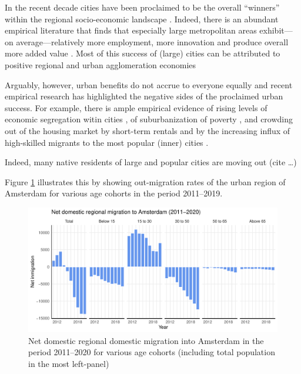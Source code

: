 \documentclass[11pt,parskip,abstracton,notitlepage, dvipsnames]{scrartcl}
\begin{document}
In the recent decade cities have been proclaimed to be the overall ``winners''
within the regional socio-economic landscape \citep[]{glaeser2012triumph}.
Indeed, there is an abundant empirical literature that finds that especially
large metropolitan areas exhibit---on average---relatively more employment, more
innovation and produce overall more added value \citep[see,
e.g.,][]{balland2020complex}. Most of this success of (large) cities can be
attributed to positive regional and urban agglomeration economies \citep[see for
recent overviews of the size, scope and nature of these urban
economies][]{melo2009meta, duranton2020, rosenthal2020}

Arguably, however, urban benefits do not accrue to everyone equally and recent
empirical research has highlighted the negative sides of the proclaimed urban
success. For example, there is ample empirical evidence of rising levels of
economic segregation witin cities \citep{tammaru2015socio}, of suburbanization
of poverty \citep{hochstenbach2018gentrification}, and crowding out of the
housing market by short-term rentals \citep{koster2018short} and by the
increasing influx of high-skilled migrants to the most popular (inner) cities
\citep{beckers2019residential}.

Indeed, many native residents of large and popular cities are moving out (cite \dots)

Figure \ref{fig:adam_mig} illustrates this by showing out-migration rates of the
urban region of Amsterdam for
various age cohorts in the period 2011--2019. 

\begin{figure}[h!]\centering %
 \includegraphics[width=1\linewidth]{../../fig/outmig_amsterdam.pdf}
 \caption{Net domestic regional domestic migration into Amsterdam in the period 2011--2020 for
   various age cohorts (including total population in the most left-panel)}
  \label{fig:adam_mig}
\end{figure}
\end{document}
